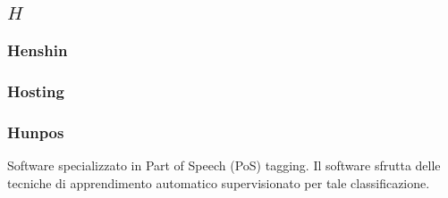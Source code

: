 \subsection*{\quad$H\quad$}

\subsubsection*{Henshin}

\subsubsection*{Hosting}

\subsubsection*{Hunpos}
Software specializzato in Part of Speech (PoS) tagging\glo. Il software sfrutta delle tecniche di apprendimento automatico supervisionato per tale classificazione.  

